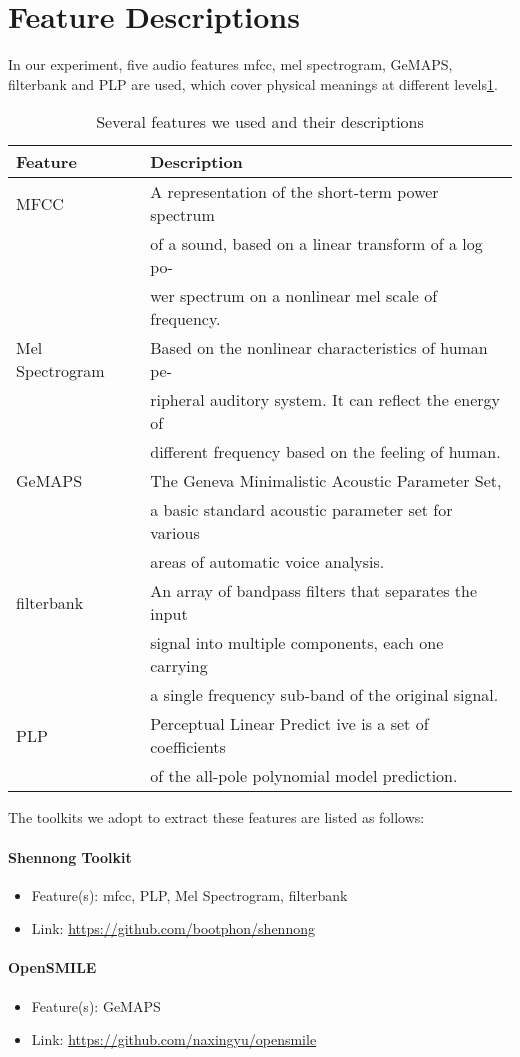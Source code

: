 

\section{Feature Descriptions}


In our experiment, five audio features mfcc, mel spectrogram, GeMAPS, filterbank and PLP are used, which cover physical meanings at different levels\ref{table:featuremeaning}. 

\begin{table}[ht]
	\centering
	\scriptsize
	\begin{tabular}{l|l}
		\toprule
		    Feature & Description    \\
		\midrule
	    MFCC &  A representation of the short-term power spectrum\\
	    & of a sound, based on a linear transform of a log po-\\
	    & wer spectrum on a nonlinear mel scale of frequency.   \\
		Mel Spectrogram &  Based on the nonlinear characteristics of human pe- \\
		& ripheral auditory system. It can reflect the energy of\\
		& different frequency based on the feeling of human. \\
		GeMAPS & The Geneva Minimalistic Acoustic Parameter Set, \\
		& a basic standard acoustic parameter set for various\\
		& areas of automatic voice analysis.  \\
		filterbank & An array of bandpass filters that separates the input\\
		& signal into multiple components, each one carrying \\
		& a single frequency sub-band of the original signal. \\
		PLP & Perceptual Linear Predict ive is a set of coefficients\\
		& of the all-pole polynomial model prediction.\\
		\bottomrule
	\end{tabular}
	\caption{Several features we used and their descriptions}
	\label{table:featuremeaning}
\end{table}


The toolkits we adopt to extract these features are listed as follows:

\paragraph{Shennong Toolkit}
\begin{itemize}
    \item Feature(s): mfcc, PLP, Mel Spectrogram, filterbank
    \item Link: \url{https://github.com/bootphon/shennong}
\end{itemize}


\paragraph{OpenSMILE}
\begin{itemize}
    \item Feature(s): GeMAPS
    \item Link: \url{https://github.com/naxingyu/opensmile}
\end{itemize}
